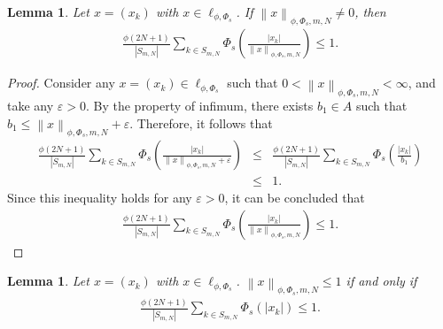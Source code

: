 \documentclass[12pt,a4paper]{article}
\newtheorem{lemma}[definition]{Lemma}
\theoremstyle{remark}
\begin{document}
\begin{lemma}
    Let $x=\left(x_k\right)$ with $x\in\ell_{\phi,\Phi_s}$. If  $\left\lVert x\right\rVert _{\phi,\Phi_s,m,N}\ne 0$, then 
    \begin{eqnarray*}
        \frac{\phi\left(2N+1\right)}{\left|S_{m,N}\right|}\sum_{k\in S_{m,N}}\Phi_s\left(\frac{\left|x_k\right|}{\left\lVert x\right\rVert _{\phi,\Phi_s,m,N}}\right)\leq1.
    \end{eqnarray*}
\end{lemma}
\begin{proof}
    Consider any $x=\left(x_k\right)\in \ell_{\phi, \Phi_s}$ such that $0 < \left\lVert x\right\rVert_{\phi, \Phi_s, m, N} < \infty$, and take any $\varepsilon > 0$. By the property of infimum, there exists $b_1 \in A$ such that $b_1 \leq \left\lVert x\right\rVert_{\phi, \Phi_s, m, N} + \varepsilon$. Therefore, it follows that
    \begin{eqnarray*}
        \frac{\phi\left(2N+1\right)}{\left|S_{m,N}\right|}\sum_{k\in S_{m,N}}\Phi_s\left(\frac{\left|x_k\right|}{\left\lVert x\right\rVert_{\phi, \Phi_s, m, N} + \varepsilon}\right) &\leq& \frac{\phi\left(2N+1\right)}{\left|S_{m,N}\right|}\sum_{k\in S_{m,N}}\Phi_s\left(\frac{\left|x_k\right|}{b_1}\right)\\
        &\leq& 1.
    \end{eqnarray*}
    Since this inequality holds for any $\varepsilon > 0$, it can be concluded that 
    \begin{eqnarray*}
        \frac{\phi\left(2N+1\right)}{\left|S_{m,N}\right|}\sum_{k\in S_{m,N}}\Phi_s\left(\frac{\left|x_k\right|}{\left\lVert x\right\rVert_{\phi, \Phi_s, m, N}}\right)\leq 1.
    \end{eqnarray*}
\end{proof}

\begin{lemma}
    Let $x=\left(x_k\right)$ with $x\in\ell_{\phi,\Phi_s}$. $\left\lVert x\right\rVert _{\phi,\Phi_s,m,N}\leq 1$ if and only if 
    \begin{eqnarray*}
        \frac{\phi\left(2N+1\right)}{\left|S_{m,N}\right|}\sum_{k\in S_{m,N}}\Phi_s\left(\left|x_k\right|\right)\leq1.
    \end{eqnarray*}
\end{lemma}
\end{document}
